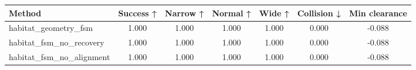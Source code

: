 \begin{tabular}{lcccccc}
\toprule
Method & Success ↑ & Narrow ↑ & Normal ↑ & Wide ↑ & Collision ↓ & Min clearance \\
\midrule
habitat_geometry_fsm & 1.000 & 1.000 & 1.000 & 1.000 & 0.000 & -0.088 \\
habitat_fsm_no_recovery & 1.000 & 1.000 & 1.000 & 1.000 & 0.000 & -0.088 \\
habitat_fsm_no_alignment & 1.000 & 1.000 & 1.000 & 1.000 & 0.000 & -0.088 \\
\bottomrule
\end{tabular}
